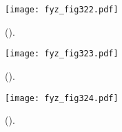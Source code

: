   \begin{figure}[ht!]  %
    \centering
    \texttt{[image: fyz\_fig322.pdf]}
    \caption{
             (\cite[s.~148]{Feynman02}).}
    \label{fyz:fig322}
  \end{figure}
  
  \begin{figure}[ht!]  %
    \centering
    \texttt{[image: fyz\_fig323.pdf]}
    \caption{
             (\cite[s.~148]{Feynman02}).}
    \label{fyz:fig323}
  \end{figure}
  
  \begin{figure}[ht!]  %
    \centering
    \texttt{[image: fyz\_fig324.pdf]}
    \caption{
             (\cite[s.~148]{Feynman02}).}
    \label{fyz:fig324}
  \end{figure}

  \begin{figure}[hb!]
    \centering
    \caption{ }
    \label{fyz:fig325}
  \end{figure}

